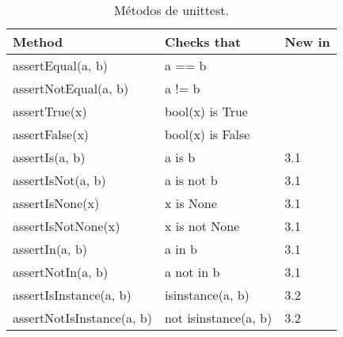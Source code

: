 \documentclass[conference]{IEEEtran}
\begin{document}
\begin{table}[H]
  \centering
  \caption{Métodos de unittest.}
    \begin{tabular}{|p{10.335em}|p{6.28em}|p{4em}|}
    \toprule
    \rowcolor[rgb]{ .933,  .933,  .933} \textcolor[rgb]{ .133,  .133,  .133}{\textbf{Method}} & \textcolor[rgb]{ .133,  .133,  .133}{\textbf{Checks that}} & \textcolor[rgb]{ .133,  .133,  .133}{\textbf{New in}} \\
    \midrule
    \textcolor[rgb]{ .02,  .388,  .757}{assertEqual(a, b)} & \textcolor[rgb]{ .133,  .133,  .133}{a == b} & \multicolumn{1}{l|}{\textcolor[rgb]{ .133,  .133,  .133}{}} \\
    \midrule
    \textcolor[rgb]{ .02,  .388,  .757}{assertNotEqual(a, b)} & \textcolor[rgb]{ .133,  .133,  .133}{a != b} & \multicolumn{1}{l|}{\textcolor[rgb]{ .133,  .133,  .133}{}} \\
    \midrule
    \textcolor[rgb]{ .02,  .388,  .757}{assertTrue(x)} & \textcolor[rgb]{ .133,  .133,  .133}{bool(x) is True} & \multicolumn{1}{l|}{\textcolor[rgb]{ .133,  .133,  .133}{}} \\
    \midrule
    \textcolor[rgb]{ .02,  .388,  .757}{assertFalse(x)} & \textcolor[rgb]{ .133,  .133,  .133}{bool(x) is False} & \multicolumn{1}{l|}{\textcolor[rgb]{ .133,  .133,  .133}{}} \\
    \midrule
    \textcolor[rgb]{ .02,  .388,  .757}{assertIs(a, b)} & \textcolor[rgb]{ .133,  .133,  .133}{a is b} & \textcolor[rgb]{ .133,  .133,  .133}{3.1} \\
    \midrule
    \textcolor[rgb]{ .02,  .388,  .757}{assertIsNot(a, b)} & \textcolor[rgb]{ .133,  .133,  .133}{a is not b} & \textcolor[rgb]{ .133,  .133,  .133}{3.1} \\
    \midrule
    \textcolor[rgb]{ .02,  .388,  .757}{assertIsNone(x)} & \textcolor[rgb]{ .133,  .133,  .133}{x is None} & \textcolor[rgb]{ .133,  .133,  .133}{3.1} \\
    \midrule
    \textcolor[rgb]{ .02,  .388,  .757}{assertIsNotNone(x)} & \textcolor[rgb]{ .133,  .133,  .133}{x is not None} & \textcolor[rgb]{ .133,  .133,  .133}{3.1} \\
    \midrule
    \textcolor[rgb]{ .02,  .388,  .757}{assertIn(a, b)} & \textcolor[rgb]{ .133,  .133,  .133}{a in b} & \textcolor[rgb]{ .133,  .133,  .133}{3.1} \\
    \midrule
    \textcolor[rgb]{ .02,  .388,  .757}{assertNotIn(a, b)} & \textcolor[rgb]{ .133,  .133,  .133}{a not in b} & \textcolor[rgb]{ .133,  .133,  .133}{3.1} \\
    \midrule
    \textcolor[rgb]{ .02,  .388,  .757}{assertIsInstance(a, b)} & \textcolor[rgb]{ .133,  .133,  .133}{isinstance(a, b)} & \textcolor[rgb]{ .133,  .133,  .133}{3.2} \\
    \midrule
    \textcolor[rgb]{ .02,  .388,  .757}{assertNotIsInstance(a, b)} & \textcolor[rgb]{ .133,  .133,  .133}{not isinstance(a, b)} & \textcolor[rgb]{ .133,  .133,  .133}{3.2} \\
    \bottomrule
    \end{tabular}%
  \label{tab:addlabel}%
\end{table}%
\end{document}
